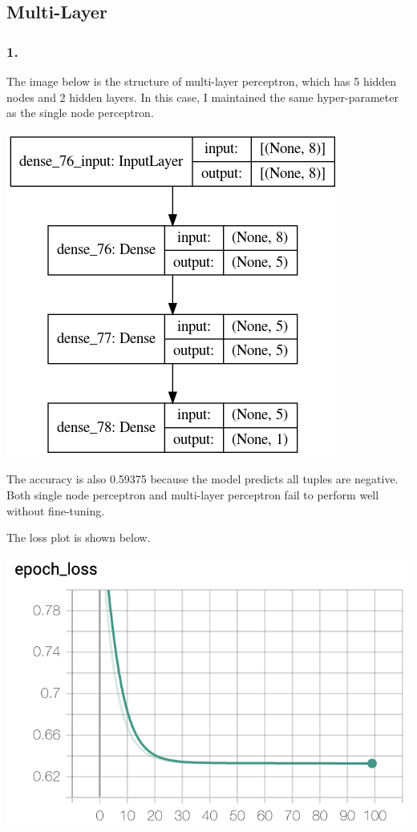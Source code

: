 \documentclass{article}
\begin{document}
\subsection{Multi-Layer}

\subsubsection{1.}

The image below is the structure of multi-layer perceptron, which has 5 hidden nodes and 2 hidden layers. In this case, I maintained the same hyper-parameter as the single node perceptron.

\includegraphics[scale=0.5]{multilayer_True_sigmoid_0.01_100.png}

The accuracy is also 0.59375 because the model predicts all tuples are negative. Both single node perceptron and multi-layer perceptron fail to perform well without fine-tuning.

The loss plot is shown below.

\includegraphics[scale=0.5]{multi_layer_loss.png}
\end{document}
